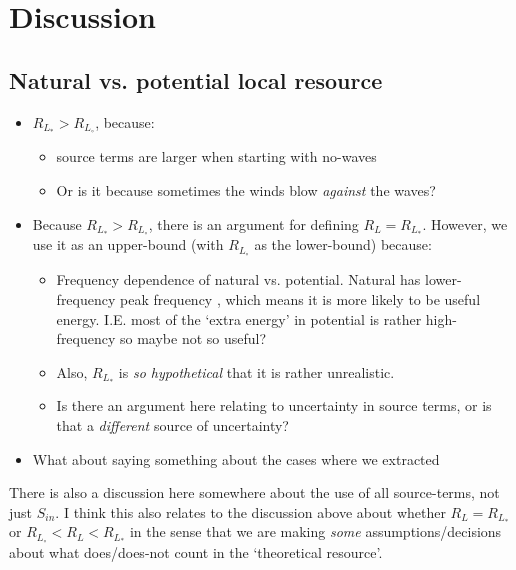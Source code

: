 
\section{Discussion} \label{sec:discussion}

\subsection{Natural vs. potential local resource}

\begin{itemize}
\item $R_{L_*} > R_{L_\circ}$, because:
  \begin{itemize}
  \item source terms are larger when starting with no-waves 
  \item Or is it because sometimes the winds blow {\em against} the waves?
  \end{itemize}
\item Because $R_{L_*} > R_{L_\circ}$, there is an argument for defining $R_L = R_{L_*}$. However, we use it as an upper-bound (with $R_{L_\circ}$ as the lower-bound) because:
  \begin{itemize}
  \item Frequency dependence of natural vs. potential. Natural has lower-frequency peak frequency , which means it is more likely to be useful energy. I.E. most of the `extra energy' in potential is rather high-frequency so maybe not so useful?
  \item Also, $R_{L_*}$ is {\em so hypothetical} that it is rather unrealistic.
  \item Is there an argument here relating to uncertainty in source terms, or is that a {\em different} source of uncertainty?
  \end{itemize}
\item What about saying something about the cases where we extracted 
\end{itemize}

There is also a discussion here somewhere about the use of all source-terms, not just $S_{in}$. I think this also relates to the discussion above about whether $R_L = R_{L_*}$ or $R_{L_\circ} < R_L < R_{L_*}$ in the sense that we are making {\em some} assumptions/decisions about what does/does-not count in the `theoretical resource'. 


